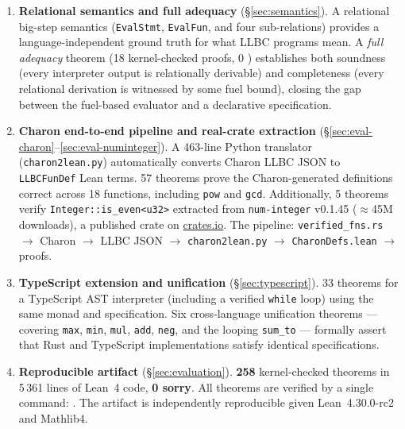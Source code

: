 \begin{enumerate}[label=\textbf{C\arabic*.},leftmargin=2em]
  \item \textbf{Relational semantics and full adequacy} (\S\ref{sec:semantics}).
        A relational big-step semantics (\texttt{EvalStmt}, \texttt{EvalFun},
        and four sub-relations) provides a language-independent ground truth for
        what LLBC programs mean. A \emph{full adequacy} theorem (18 kernel-checked
        proofs, 0 \sorry) establishes both soundness (every interpreter output is
        relationally derivable) and completeness (every relational derivation is
        witnessed by some fuel bound), closing the gap between the fuel-based
        evaluator and a declarative specification.

  \item \textbf{Charon end-to-end pipeline and real-crate extraction}
        (\S\ref{sec:eval-charon}--\ref{sec:eval-numinteger}).
        A 463-line Python translator (\texttt{charon2lean.py}) automatically
        converts Charon LLBC JSON to \texttt{LLBCFunDef} Lean terms.
        57 theorems prove the Charon-generated definitions correct across
        18 functions, including \texttt{pow} and \texttt{gcd}.
        Additionally, 5 theorems verify \texttt{Integer::is\_even<u32>}
        extracted from \texttt{num-integer} v0.1.45 (${\approx}$45M downloads),
        a published crate on \url{crates.io}.
        The pipeline: \texttt{verified\_fns.rs} $\to$ Charon $\to$ LLBC JSON $\to$
        \texttt{charon2lean.py} $\to$ \texttt{CharonDefs.lean} $\to$ proofs.

  \item \textbf{TypeScript extension and unification} (\S\ref{sec:typescript}).
        33 theorems for a TypeScript AST interpreter (including a verified
        \texttt{while} loop) using the same \RustM monad and \ProgramSpec
        specification. Six cross-language unification theorems — covering
        \texttt{max}, \texttt{min}, \texttt{mul}, \texttt{add}, \texttt{neg},
        and the looping \texttt{sum\_to} — formally assert that Rust and
        TypeScript implementations satisfy identical specifications.

  \item \textbf{Reproducible artifact} (\S\ref{sec:evaluation}). \textbf{258} kernel-checked
        theorems in 5\,361 lines of Lean~4 code, \textbf{0 sorry}. All theorems are verified
        by a single command: . The artifact is
        independently reproducible given Lean~4.30.0-rc2 and Mathlib4.
\end{enumerate}

